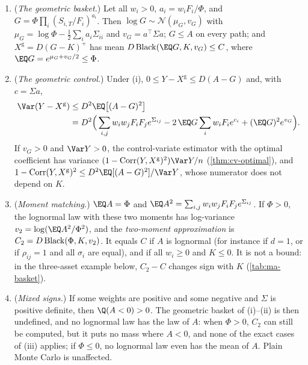 \begin{proposition}\label{prop:ma-basket}
\begin{enumerate}[label=(\roman*)]
  \item (\emph{The geometric basket.}) Let all $w_i>0$, $a_i=w_iF_i/\Phi$, and
    $G=\Phi\prod_i(S_{i,T}/F_i)^{a_i}$. Then $\log G\sim\mathcal N(\mu_G,v_G)$ with
    $\mu_G=\log\Phi-\frac12\sum_ia_i\Sigma_{ii}$ and $v_G=a^\top\Sigma a$; $G\le A$ on every path;
    and $X^{\mathrm g}=D(G-K)^+$ has mean $D\Black(\EQ G,K,v_G)\le C$, where
    $\EQ G=e^{\mu_G+v_G/2}\le\Phi$.
  \item (\emph{The geometric control.}) Under (i), $0\le Y-X^{\mathrm g}\le D(A-G)$ and, with
    $c=\Sigma a$,
    \begin{align*}
      \Var(Y-X^{\mathrm g})&\le D^2\EQ\big[(A-G)^2\big]\\
      &=D^2\Big(\sum_{i,j}w_iw_jF_iF_je^{\Sigma_{ij}}-2\,\EQ G\sum_iw_iF_ie^{c_i}+(\EQ G)^2e^{v_G}\Big).
    \end{align*}
    If $v_G>0$ and $\Var Y>0$, the control-variate estimator with the optimal coefficient has variance
    $(1-\Corr(Y,X^{\mathrm g})^2)\Var Y/n$ (\cref{thm:cv-optimal}), and
    $1-\Corr(Y,X^{\mathrm g})^2\le D^2\EQ[(A-G)^2]/\Var Y$, whose numerator does not depend on $K$.
  \item (\emph{Moment matching.}) $\EQ A=\Phi$ and $\EQ A^2=\sum_{i,j}w_iw_jF_iF_je^{\Sigma_{ij}}$. If
    $\Phi>0$, the lognormal law with these two moments has log-variance
    $v_2=\log(\EQ A^2/\Phi^2)$, and the \emph{two-moment approximation} is
    $C_2=D\operatorname{Black}(\Phi,K,v_2)$. It equals $C$ if $A$ is lognormal (for instance if $d=1$, or if
    $\rho_{ij}=1$ and all $\sigma_i$ are equal), and if all $w_i\ge0$ and $K\le0$. It is not a bound:
    in the three-asset example below, $C_2-C$ changes sign with $K$ (\cref{tab:ma-basket}).
  \item (\emph{Mixed signs.}) If some weights are positive and some negative and $\Sigma$ is
    positive definite, then $\Q(A<0)>0$. The geometric basket of (i)--(ii) is then undefined, and no
    lognormal law has the law of $A$: when $\Phi>0$, $C_2$ can still be computed, but it puts no mass where
    $A<0$, and none of the exact cases of (iii) applies; if $\Phi\le0$, no lognormal law even has the
    mean of $A$. Plain Monte Carlo is unaffected.
\end{enumerate}
\end{proposition}

